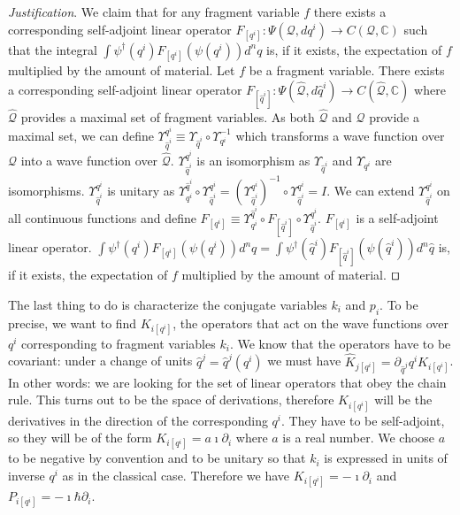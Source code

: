 \documentclass[smallextended]{svjour3}
\numberwithin{equation}{section}
\newenvironment{justification}{\emph{Justification}.}{\hfill\(\qed\)}
\theoremstyle{definition}
\newenvironment{justification}{\emph{Justification}.}{\qed}
\begin{document}
\begin{justification}
	We claim that for any fragment variable $f$ there exists a corresponding self-adjoint linear operator $F_{[q^i]} : \Psi(\mathcal{Q}, dq^i) \rightarrow C(\mathcal{Q}, \mathbb{C})$ such that the integral $\int \psi^\dagger(q^i) F_{[q^i]}( \psi(q^i)) d^nq$ is, if it exists, the expectation of $f$ multiplied by the amount of material. Let $f$ be a fragment variable. There exists a corresponding self-adjoint linear operator $F_{[\hat{q}^i]} : \Psi(\hat{\mathcal{Q}}, d\hat{q}^i) \rightarrow C(\hat{\mathcal{Q}}, \mathbb{C})$ where $\hat{\mathcal{Q}}$ provides a maximal set of fragment variables. As both $\hat{\mathcal{Q}}$ and $\mathcal{Q}$ provide a maximal set, we can define $\Upsilon^{q^i}_{\hat{q}^i} \equiv \Upsilon_{\hat{q}^i} \circ \Upsilon_{q^i}^{-1}$ which transforms a wave function over $\mathcal{Q}$ into a wave function over $\hat{\mathcal{Q}}$. $\Upsilon^{q^i}_{\hat{q}^i}$ is an isomorphism as $\Upsilon_{\hat{q}^i}$ and $\Upsilon_{q^i}$ are isomorphisms. $\Upsilon^{q^i}_{\hat{q}^i}$ is unitary as $\Upsilon^{\hat{q}^i}_{q^i} \circ \Upsilon^{q^i}_{\hat{q}^i} = (\Upsilon^{q^i}_{\hat{q}^i})^{-1} \circ \Upsilon^{q^i}_{\hat{q}^i} = I$. We can extend $\Upsilon^{q^i}_{\hat{q}^i}$ on all continuous functions and define $F_{[q^i]} \equiv \Upsilon^{\hat{q}^i}_{q^i} \circ F_{[\hat{q}^i]} \circ \Upsilon^{q^i}_{\hat{q}^i}$. $F_{[q^i]}$ is a self-adjoint linear operator. $\int \psi^\dagger(q^i) F_{[q^i]}( \psi(q^i)) d^nq = \int \psi^\dagger(\hat{q}^i) F_{[\hat{q}^i]}( \psi(\hat{q}^i)) d^n \hat{q}$ is, if it exists, the expectation of $f$ multiplied by the amount of material.
\end{justification}

The last thing to do is characterize the conjugate variables $k_i$ and $p_i$. To be precise, we want to find $K_{i [q^i]}$, the operators that act on the wave functions over $q^i$ corresponding to fragment variables $k_i$. We know that the operators have to be covariant: under a change of units $\hat{q}^j = \hat{q}^j(q^i)$ we must have $\hat{K}_{j[q^i]} = \partial_{\hat{q}^j} q^i K_{i [q^i]}$. In other words: we are looking for the set of linear operators that obey the chain rule. This turns out to be the space of derivations, therefore $K_{i [q^i]}$ will be the derivatives in the direction of the corresponding $q^i$. They have to be self-adjoint, so they will be of the form $K_{i [q^i]} = a \imath \partial_{i}$ where $a$ is a real number. We choose $a$ to be negative by convention and to be unitary so that $k_i$ is expressed in units of inverse $q^i$ as in the classical case. Therefore we have $K_{i [q^i]} = -\imath \partial_i$ and $P_{i [q^i]} = -\imath \hbar \partial_i$.
\end{document}
